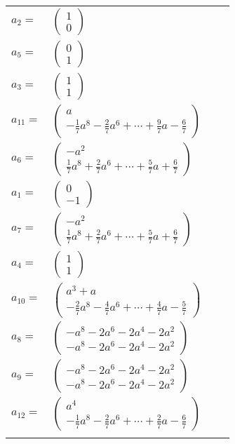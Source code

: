 \documentclass[1p]{elsarticle_modified}
\theoremstyle{definition}
\begin{document}
\begin{tabular}{m{7pt} m{180pt} m{7pt} m{180pt} }
\flushright $a_{2}=$&$\begin{pmatrix}1\\0\end{pmatrix}$ \\
\flushright $a_{5}=$&$\begin{pmatrix}0\\1\end{pmatrix}$ \\
\flushright $a_{3}=$&$\begin{pmatrix}1\\1\end{pmatrix}$ \\
\flushright $a_{11}=$&$\begin{pmatrix}a\\-\frac{1}{7} a^8-\frac{2}{7} a^6+\cdots+\frac{9}{7} a-\frac{6}{7}\end{pmatrix}$ \\
\flushright $a_{6}=$&$\begin{pmatrix}- a^2\\\frac{1}{7} a^8+\frac{2}{7} a^6+\cdots+\frac{5}{7} a+\frac{6}{7}\end{pmatrix}$ \\
\flushright $a_{1}=$&$\begin{pmatrix}0\\-1\end{pmatrix}$ \\
\flushright $a_{7}=$&$\begin{pmatrix}- a^2\\\frac{1}{7} a^8+\frac{2}{7} a^6+\cdots+\frac{5}{7} a+\frac{6}{7}\end{pmatrix}$ \\
\flushright $a_{4}=$&$\begin{pmatrix}1\\1\end{pmatrix}$ \\
\flushright $a_{10}=$&$\begin{pmatrix}a^3+a\\-\frac{2}{7} a^8-\frac{4}{7} a^6+\cdots+\frac{4}{7} a-\frac{5}{7}\end{pmatrix}$ \\
\flushright $a_{8}=$&$\begin{pmatrix}- a^8-2 a^6-2 a^4-2 a^2\\- a^8-2 a^6-2 a^4-2 a^2\end{pmatrix}$ \\
\flushright $a_{9}=$&$\begin{pmatrix}- a^8-2 a^6-2 a^4-2 a^2\\- a^8-2 a^6-2 a^4-2 a^2\end{pmatrix}$ \\
\flushright $a_{12}=$&$\begin{pmatrix}a^4\\-\frac{1}{7} a^8-\frac{2}{7} a^6+\cdots+\frac{2}{7} a-\frac{6}{7}\end{pmatrix}$\\&\end{tabular}
\end{document}
